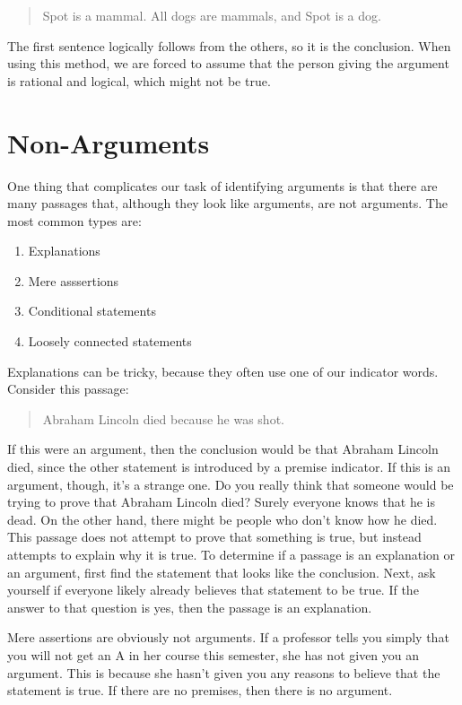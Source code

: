 \begin{quote}
Spot is a mammal. All dogs are mammals, and Spot is a dog.
\end{quote}

The first sentence logically follows from the others, so it is the conclusion. When using this method, we are forced to assume that the person giving the argument is rational and logical, which might not be true.

\section{Non-Arguments}
\label{sec:non-arguments}

One thing that complicates our task of identifying arguments is that there are many passages that, although they look like arguments, are not arguments. The most common types are:

\begin{enumerate}
\item Explanations
\item Mere asssertions
\item Conditional statements
\item Loosely connected statements
\end{enumerate}

Explanations can be tricky, because they often use one of our indicator words. Consider this passage:

\begin{quote}
Abraham Lincoln died because he was shot.
\end{quote}

If this were an argument, then the conclusion would be that Abraham Lincoln died, since the other statement is introduced by a premise indicator. If this is an argument, though, it's a strange one. Do you really think that someone would be trying to prove that Abraham Lincoln died? Surely everyone knows that he is dead. On the other hand, there might be people who don't know how he died. This passage does not attempt to prove that something is true, but instead attempts to explain why it is true. To determine if a passage is an explanation or an argument, first find the statement that looks like the conclusion. Next, ask yourself if everyone likely already believes that statement to be true. If the answer to that question is yes, then the passage is an explanation.

Mere assertions are obviously not arguments. If a professor tells you simply that you will not get an A in her course this semester, she has not given you an argument. This is because she hasn't given you any reasons to believe that the statement is true. If there are no premises, then there is no argument.

